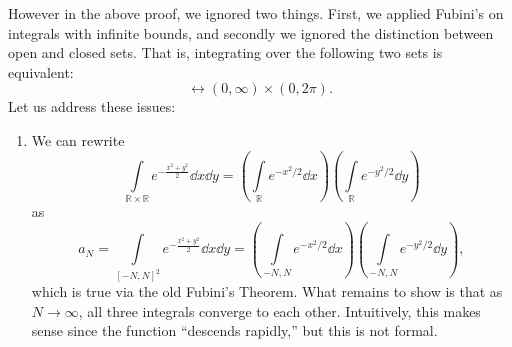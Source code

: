 \documentclass{article}
\numberwithin{equation}{section}
\begin{document}
However in the above proof, we ignored two things. First, we applied Fubini's on integrals with infinite bounds, and secondly we ignored the distinction between open and closed sets. That is, integrating over the following two sets is equivalent:
\begin{equation}
    [0,\infty) \times [0,2\pi] \leftrightarrow (0,\infty) \times (0,2\pi).
\end{equation}
Let us address these issues:
\begin{enumerate}
    \item We can rewrite
    \begin{equation}
        \int\limits_{\mathbb{R} \times \mathbb{R}} e^{-\frac{x^2+y^2}{2}} \dd{x} \dd{y} = \left(\int\limits_{\mathbb{R}} e^{-x^2/2}\dd{x}\right) \left(\int\limits_{\mathbb{R}} e^{-y^2/2}\dd{y}\right)
    \end{equation}
    as
    \begin{equation}
        a_N = \int\limits_{[-N,N]^2} e^{-\frac{x^2+y^2}{2}} \dd{x} \dd{y} = \left(\int\limits_{-N,N} e^{-x^2/2} \dd{x}\right)\left(\int\limits_{-N,N}e^{-y^2/2}\dd{y}\right),
    \end{equation}
    which is true via the old Fubini's Theorem. What remains to show is that as $N\to\infty$, all three integrals converge to each other. Intuitively, this makes sense since the function ``descends rapidly,'' but this is not formal.
    

\end{enumerate}
\end{document}
